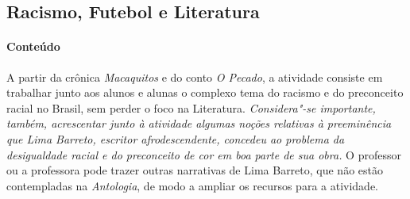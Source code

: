 \documentclass{extarticle}
\begin{document}




\subsection{Racismo, Futebol e Literatura}


\paragraph{Conteúdo} A partir da crônica {\textit{Macaquitos}} e do
conto {\textit{O Pecado}}, a atividade consiste em trabalhar junto
aos alunos e alunas o complexo tema do racismo e do preconceito racial
no Brasil, sem perder o foco na Literatura. \emph{Considera"-se
importante, também, acrescentar junto à atividade algumas noções
relativas à preeminência que Lima Barreto, escritor afrodescendente,
concedeu ao problema da desigualdade racial e do preconceito de cor em
boa parte de sua obra.} O professor ou a professora pode trazer outras
narrativas de Lima Barreto, que não estão contempladas na
\emph{Antologia}, de modo a ampliar os recursos para a atividade.




\end{document}

